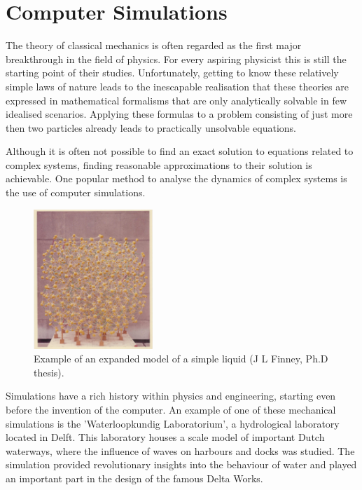 \section{Computer Simulations}

The theory of classical mechanics is often regarded as the first major breakthrough in
the field of physics. For every aspiring physicist this is still the starting point of
their studies. Unfortunately, getting to know these relatively simple laws of nature
leads to the inescapable realisation that these theories are expressed in mathematical
formalisms that are only analytically solvable in few idealised scenarios. Applying these
formulas to a problem consisting of just more then two particles already leads to
practically unsolvable equations.

Although it is often not possible to find an exact solution to equations
related to complex systems, finding reasonable approximations to their solution
is achievable. One popular method to analyse the dynamics of complex systems is the use
of computer simulations.

\begin{figure}
    \vspace{-0.5cm}
  \begin{center}
    \includegraphics[width=0.4\textwidth]{Figures/WaterModel.png}
  \end{center}
  \caption[Example of an expanded model of a simple liquid.]{Example of an expanded model
  of a simple liquid (J L Finney, Ph.D thesis).
  \cite{Finney_2007}}
\end{figure}

Simulations have a rich history within physics and engineering, starting even before the
invention of the computer. An example of one of these mechanical simulations is the
'Waterloopkundig Laboratorium', a hydrological laboratory located in Delft.
\cite{Vreugdenhil2001}  This
laboratory houses a scale model of important Dutch waterways, where the influence of
waves on harbours and docks was studied.  The simulation provided revolutionary insights
into the behaviour of water and played an important part in the design of the famous
Delta Works.

